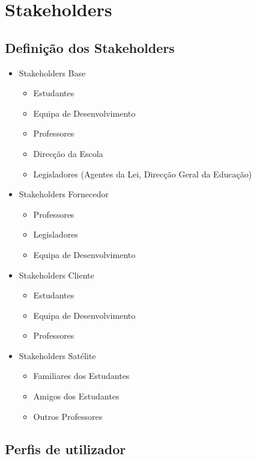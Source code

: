 \chapter{Stakeholders}
\label{chap:stake} 

\section{Definição dos Stakeholders}

\begin{itemize}
	\item Stakeholders Base
\begin{itemize}
\item Estudantes
\item Equipa de Desenvolvimento
\item Professores
\item Direcção da Escola
\item Legisladores (Agentes da Lei, Direcção Geral da Educação)
\end{itemize}
	\item Stakeholders Fornecedor
\begin{itemize}
\item Professores
\item Legisladores
\item Equipa de Desenvolvimento
\end{itemize}
	\item Stakeholders Cliente
\begin{itemize}
\item Estudantes
\item Equipa de Desenvolvimento
\item Professores
\end{itemize}
	\item Stakeholders Satélite
\begin{itemize}
\item Familiares dos Estudantes
\item Amigos dos Estudantes
\item Outros Professores
\end{itemize}
\end{itemize}

\section{Perfis de utilizador}

